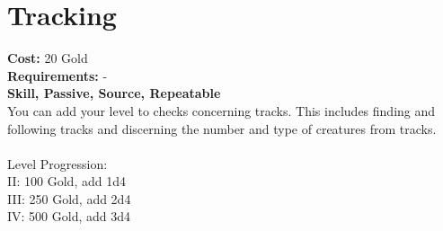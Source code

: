 \section{Tracking}
\textbf{Cost:} 20 Gold\\
\textbf{Requirements:} -\\
\textbf{Skill, Passive, Source, Repeatable}\\
You can add your level to checks concerning tracks. This includes finding and following tracks and discerning the number and type of creatures from tracks.\\
\\
Level Progression:\\
II: 100 Gold, add 1d4\\
III: 250 Gold, add 2d4\\
IV: 500 Gold, add 3d4\\